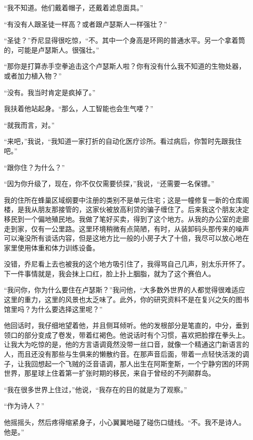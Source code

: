 \documentclass[AutoFakeBold=true]{book}
\begin{document}
``我不知道。他们戴着帽子，还戴着滤息面具。''

``有没有人跟圣徒一样高？或者跟卢瑟斯人一样强壮？''

``圣徒？''乔尼显得很吃惊，``不。其中一个身高是环网的普通水平。另一个拿着筒的，可能是卢瑟斯人。很强壮。''

``那你是打算赤手空拳追击这个卢瑟斯人啦？你有没有什么我不知道的生物处器，或者加力植入物？''

``没有。我当时肯定是疯掉了。''

我扶着他站起身。``那么，人工智能也会生气喽？''

``就我而言，对。''

``来吧，''我说，``我知道一家打折的自动化医疗诊所。看过病后，你暂时先跟我住吧。''

``跟你住？为什么？''

``因为你升级了，现在，你不仅仅需要侦探，''我说，``还需要一名保镖。''

\vspace*{1em}

我的住所在蜂巢区域纲要中注册的类别不是单元住宅；这是一幢修复一新的仓库阁楼，是我从朋友那接管的，这家伙被放高利贷的骗子缠住了。后来我这个朋友决定移民到一个偏地殖民地。我做了笔好买卖，得到了这个地方。从我的办公室的走廊走到家，仅有一公里路。这里环境稍微有点简陋，有时，从装卸码头那传来的噪声可以淹没所有谈话内容，但是这地方比一般的小房子大了十倍，我尽可以放心地在家里使用体重和体力训练设备。

没错，乔尼看上去也被我的这个地方吸引住了，我得骂自己几声，别太乐开怀了。下一件事情就是，我会抹上口红，脸上扑上胭脂，就为了这个赛伯人。

``我问你，你为什么要住在卢瑟斯？''我问他，``大多数外世界的人都觉得很难适应这里的重力，这里的风景也太乏味了。此外，你的研究资料不是在复兴之矢的图书馆里吗？为什么要选择这里呢？''

他回话时，我仔细地望着他，并且侧耳倾听。他的发根部分是笔直的，中分，垂到领口的部分变成了卷发，带着红褐色。他说话时有个习惯，喜欢把脸撑在拳头上。让我大为吃惊的是，他的方言语调竟然没带一丝口音，就像一个精通这门新语言的人，而且还没有那些与生俱来的懒散约音。在那声音后面，带着一点轻快活泼的调子，让我回想起一个飞贼的泛音语调，那人出生在阿斯奎斯，一个宁静穷困的环网世界，那星球上住着第一扩张时期的移民，来自于曾经的不列颠群岛。

``我在很多世界上住过，''他说，``我存在的目的就是为了观察。''

``作为诗人？''

他摇摇头，然后疼得缩紧身子，小心翼翼地碰了碰伤口缝线。``不。我不是诗人。他是。''
\end{document}
